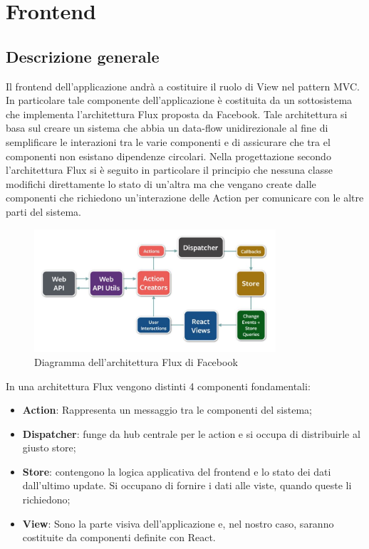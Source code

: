\section{Frontend}

\subsection{Descrizione generale}

Il frontend dell'applicazione andrà a costituire il ruolo di View nel pattern MVC. In particolare tale componente dell'applicazione è costituita da un sottosistema che implementa l'architettura Flux proposta da Facebook. Tale architettura si basa sul creare un sistema che abbia un data-flow unidirezionale al fine di semplificare le interazioni tra le varie componenti e di assicurare che tra el componenti non esistano dipendenze circolari.
Nella progettazione secondo l'architettura Flux si è seguito in particolare il principio che nessuna classe modifichi direttamente lo stato di un'altra ma che vengano create dalle componenti che richiedono un'interazione delle Action per comunicare con le altre parti del sistema.

\begin{figure}[h]
\centering
\includegraphics[width=0.8\textwidth]{res/sections/imgs/flux.jpg}
\caption{Diagramma dell'architettura Flux di Facebook}
\end{figure}
In una architettura Flux vengono distinti 4 componenti fondamentali:

\begin{itemize}
\item \textbf{Action}: Rappresenta un messaggio tra le componenti del sistema;
\item \textbf{Dispatcher}: funge da hub centrale per le action e si occupa di distribuirle al giusto store;
\item \textbf{Store}: contengono la logica applicativa del frontend e lo stato dei dati dall'ultimo update. Si occupano di fornire i dati alle viste, quando queste li richiedono;
\item \textbf{View}: Sono la parte visiva dell'applicazione e, nel nostro caso, saranno costituite da componenti definite con React.
\end{itemize}


